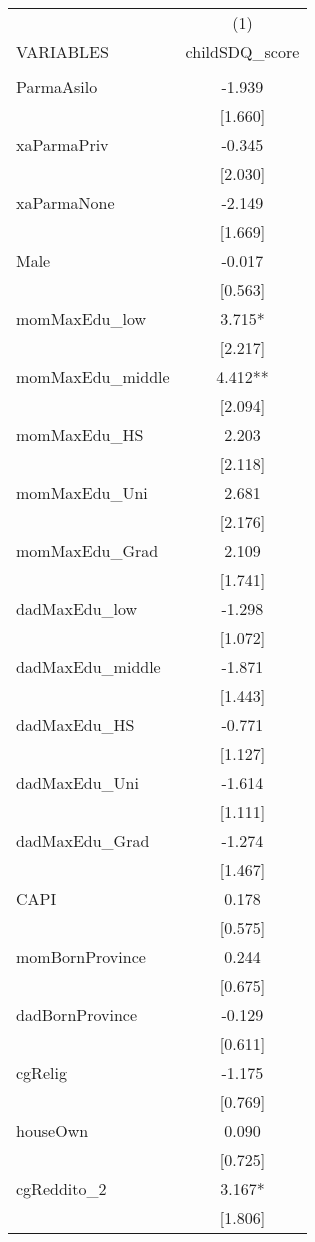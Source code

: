 \documentclass[]{article}
\begin{document}
\begin{tabular}{lc} \hline
 & (1) \\
VARIABLES & childSDQ\_score \\ \hline
 &  \\
ParmaAsilo & -1.939 \\
 & [1.660] \\
xaParmaPriv & -0.345 \\
 & [2.030] \\
xaParmaNone & -2.149 \\
 & [1.669] \\
Male & -0.017 \\
 & [0.563] \\
momMaxEdu\_low & 3.715* \\
 & [2.217] \\
momMaxEdu\_middle & 4.412** \\
 & [2.094] \\
momMaxEdu\_HS & 2.203 \\
 & [2.118] \\
momMaxEdu\_Uni & 2.681 \\
 & [2.176] \\
momMaxEdu\_Grad & 2.109 \\
 & [1.741] \\
dadMaxEdu\_low & -1.298 \\
 & [1.072] \\
dadMaxEdu\_middle & -1.871 \\
 & [1.443] \\
dadMaxEdu\_HS & -0.771 \\
 & [1.127] \\
dadMaxEdu\_Uni & -1.614 \\
 & [1.111] \\
dadMaxEdu\_Grad & -1.274 \\
 & [1.467] \\
CAPI & 0.178 \\
 & [0.575] \\
momBornProvince & 0.244 \\
 & [0.675] \\
dadBornProvince & -0.129 \\
 & [0.611] \\
cgRelig & -1.175 \\
 & [0.769] \\
houseOwn & 0.090 \\
 & [0.725] \\
cgReddito\_2 & 3.167* \\
 & [1.806] \\

\end{tabular}
\end{document}
